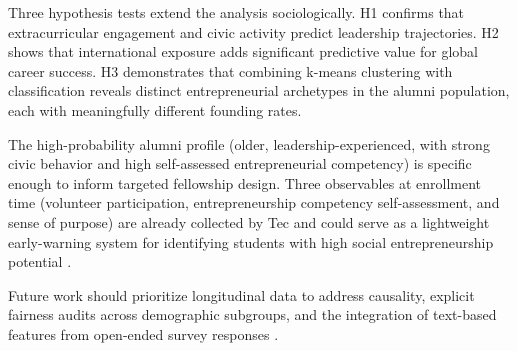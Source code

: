 \documentclass[10pt,twocolumn]{article}
\begin{document}
Three hypothesis tests extend the analysis sociologically. H1 confirms that
extracurricular engagement and civic activity predict leadership trajectories.
H2 shows that international exposure adds significant predictive value for
global career success. H3 demonstrates that combining k-means clustering with
classification reveals distinct entrepreneurial archetypes in the alumni
population, each with meaningfully different founding rates.

The high-probability alumni profile (older, leadership-experienced, with strong
civic behavior and high self-assessed entrepreneurial competency) is specific
enough to inform targeted fellowship design. Three observables at enrollment
time (volunteer participation, entrepreneurship competency self-assessment, and
sense of purpose) are already collected by Tec and could serve as a lightweight
early-warning system for identifying students with high social entrepreneurship
potential \cite{mahmoud2025, bhaskaran2024}.

Future work should prioritize longitudinal data to address causality, explicit
fairness audits across demographic subgroups, and the integration of text-based
features from open-ended survey responses \cite{alnaemi2026}.
\end{document}
